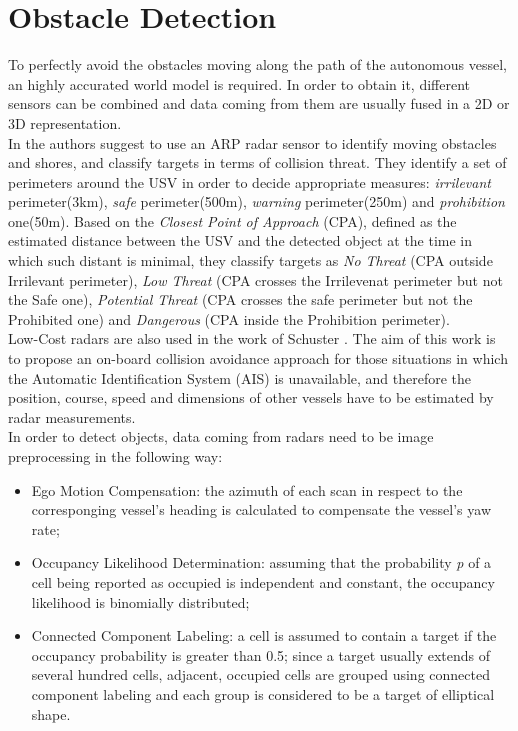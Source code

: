 \documentclass[journal]{IEEEtran}
\begin{document}
\section{Obstacle Detection} \label{obs_det}
\indent To perfectly avoid the obstacles moving along the path of the autonomous vessel, an highly accurated world model is required. In order to obtain it, different sensors can be combined and data coming from them are usually fused in a 2D or 3D representation.\\
\indent In \cite{Almeida2009} the authors suggest to use an ARP radar sensor to identify moving obstacles and shores, and classify targets in terms of collision threat. They identify a set of perimeters around the USV in order to decide appropriate measures: \textit{irrilevant} perimeter(3km), \textit{safe} perimeter(500m), \textit{warning} perimeter(250m) and \textit{prohibition} one(50m). Based on the \textit{Closest Point of Approach} (CPA), defined as the estimated distance between the USV and the detected object at the time in which such distant is minimal, they classify targets as \textit{No Threat} (CPA outside Irrilevant perimeter), \textit{Low Threat} (CPA crosses the Irrilevenat perimeter but not the Safe one), \textit{Potential Threat} (CPA crosses the safe perimeter but not the Prohibited one) and \textit{Dangerous} (CPA inside the Prohibition perimeter).\\
\indent Low-Cost radars are also used in the work of Schuster \cite{Schuster2014}. The aim of this work is to propose an on-board collision avoidance approach for those situations in which the Automatic Identification System (AIS) is unavailable, and therefore the position, course, speed and dimensions of other vessels have to be estimated by radar measurements.\\
\indent In order to detect objects, data coming from radars need to be image preprocessing in the following way:
\begin{itemize}
\item Ego Motion Compensation: the azimuth of each scan in respect to the corresponging vessel's heading is calculated to compensate the vessel's yaw rate;
\item Occupancy Likelihood Determination: assuming that the probability \textit{p} of a cell being reported as occupied is independent and constant, the occupancy likelihood is binomially distributed;
\item Connected Component Labeling: a cell is assumed to contain a target if the occupancy probability is greater than 0.5; since a target usually extends of several hundred cells, adjacent, occupied cells are grouped using connected component labeling and each group is considered to be a target of elliptical shape.
\end{itemize}
\end{document}
